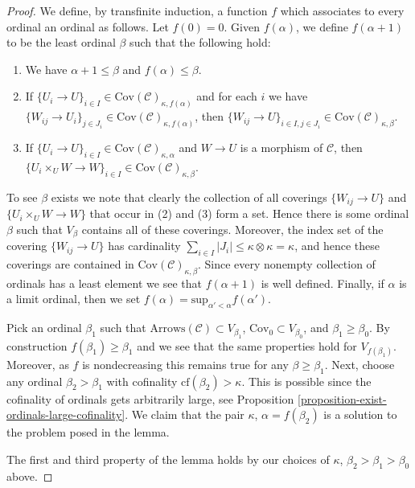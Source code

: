 \begin{proof}
\medskip\noindent
We define, by transfinite induction, a function $f$ which associates
to every ordinal an ordinal as follows. Let $f(0) = 0$.
Given $f(\alpha)$, we define $f(\alpha + 1)$ to be the least
ordinal $\beta$ such that the following hold:
\begin{enumerate}
\item We have $\alpha + 1 \leq \beta$ and $f(\alpha) \leq \beta$.
\item If $\{U_i \to U\}_{i\in I}
\in \text{Cov}(\mathcal{C})_{\kappa, f(\alpha)}$
and for each $i$ we have
$\{W_{ij} \to U_i\}_{j\in J_i}
\in \text{Cov}(\mathcal{C})_{\kappa, f(\alpha)}$,
then
$\{W_{ij} \to U\}_{i \in I, j\in J_i}
\in \text{Cov}(\mathcal{C})_{\kappa, \beta}$.
\item If $\{U_i \to U\}_{i\in I}
\in \text{Cov}(\mathcal{C})_{\kappa, \alpha}$
and $W \to U$ is a morphism of $\mathcal{C}$, then
$\{U_i \times_U W \to W \}_{i\in I}
\in \text{Cov}(\mathcal{C})_{\kappa, \beta}$.
\end{enumerate}
To see $\beta$ exists we note that clearly the collection of all
coverings $\{W_{ij} \to U\}$ and $\{U_i \times_U W \to W \}$ that occur in
(2) and (3) form a set. Hence there is some ordinal $\beta$ such that
$V_\beta$ contains all of these coverings. Moreover, the index set
of the covering $\{W_{ij} \to U\}$ has cardinality
$\sum_{i \in I} |J_i| \leq \kappa \otimes \kappa = \kappa$, and
hence these coverings are contained in
$\text{Cov}(\mathcal{C})_{\kappa, \beta}$.
Since every nonempty collection of ordinals has a least element
we see that $f(\alpha + 1)$ is well defined. Finally, if $\alpha$
is a limit ordinal, then we set
$f(\alpha) = \text{sup}_{\alpha' < \alpha} f(\alpha')$.

\medskip\noindent
Pick an ordinal $\beta_1$ such that
$\text{Arrows}(\mathcal{C}) \subset V_{\beta_1}$,
$\text{Cov}_0 \subset V_{\beta_0}$,
and $\beta_1 \geq \beta_0$.
By construction $f(\beta_1) \geq \beta_1$ and we see that
the same properties hold for $V_{f(\beta_1)}$. Moreover, as $f$ is
nondecreasing this remains true for any $\beta \geq \beta_1$.
Next, choose any ordinal $\beta_2 > \beta_1$ with
cofinality $\text{cf}(\beta_2) > \kappa$. This is possible
since the cofinality of ordinals gets arbitrarily large, see
Proposition \ref{proposition-exist-ordinals-large-cofinality}.
We claim that the pair $\kappa$,
$\alpha = f(\beta_2)$ is a solution to the problem posed in the lemma.

\medskip\noindent
The first and third property of the lemma holds by our choices
of $\kappa$, $\beta_2 > \beta_1 > \beta_0$ above.


\end{proof}
